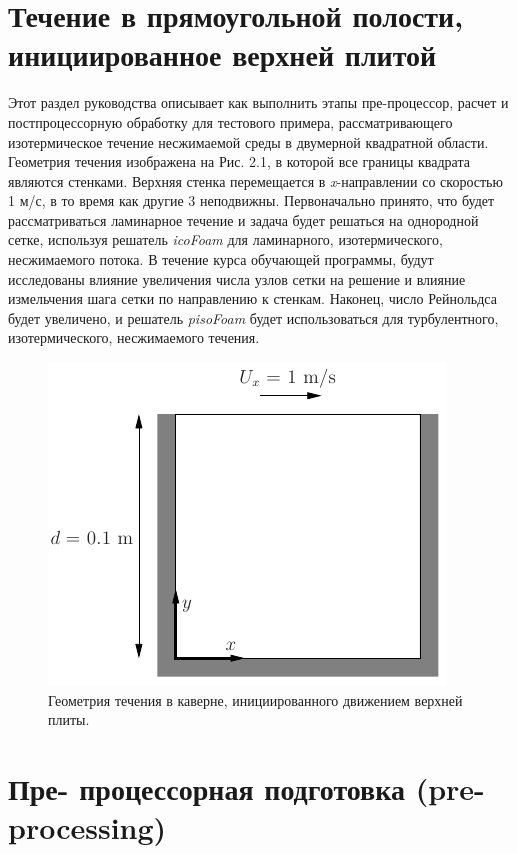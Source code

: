 \section{Течение в прямоугольной полости, инициированное верхней плитой}
\label{sec:2.1}
Этот раздел руководства описывает как выполнить этапы пре-процессор, расчет и постпроцессорную обработку для тестового
 примера, рассматривающего изотермическое течение несжимаемой среды в двумерной квадратной области. Геометрия течения
изображена на Рис. 2.1, в которой все границы квадрата являются стенками. Верхняя стенка перемещается в
\textit{x}-направлении со скоростью 1 м/с, в то время как другие 3 неподвижны. Первоначально принято, что будет
 рассматриваться ламинарное течение и задача будет решаться на однородной сетке, используя решатель \textsl{icoFoam}
 для ламинарного, изотермического, несжимаемого потока. В течение курса обучающей программы, будут исследованы влияние
 увеличения числа узлов сетки на решение и влияние измельчения шага сетки по направлению к стенкам.
Наконец, число Рейнольдса будет увеличено, и решатель \textsl{pisoFoam} будет использоваться для турбулентного,
 изотермического, несжимаемого течения.

\begin{figure}[h]
 \centering
 \includegraphics[width=299pt,height=243pt]{UGFigure2-1.PNG}
 \caption{Геометрия течения в каверне, инициированного движением верхней плиты.}
 \label{fig:2.1}
\end{figure}

\section{Пре- процессорная подготовка (pre-processing)}
\label{sec:2.1.1}

